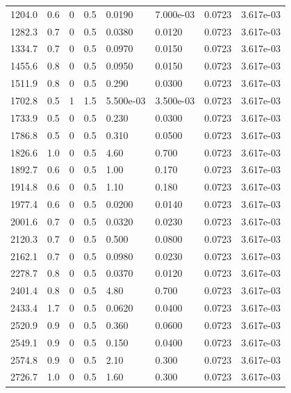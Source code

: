 \documentclass[preview]{standalone}
\begin{document}
{{\begin{tabular}{L{1.2cm}C{1.2cm} C{0.3cm}C{0.5cm} C{1.4cm}C{1.4cm} C{1.4cm}C{1.4cm}}
  1204.0  &   0.6  & 0     & 0.5 &  0.0190  & 7.000e-03  & 0.0723 &  3.617e-03   \\ 
  1282.3  &   0.7  & 0     & 0.5 &  0.0380  & 0.0120  & 0.0723 &  3.617e-03   \\ 
  1334.7  &   0.7  & 0     & 0.5 &  0.0970  & 0.0150  & 0.0723 &  3.617e-03   \\ 
  1455.6  &   0.8  & 0     & 0.5 &  0.0950  & 0.0150  & 0.0723 &  3.617e-03   \\ 
  1511.9  &   0.8  & 0     & 0.5 &  0.290  & 0.0300  & 0.0723 &  3.617e-03   \\ 
  1702.8  &   0.5  & 1     & 1.5 &  5.500e-03  & 3.500e-03  & 0.0723 &  3.617e-03   \\ 
  1733.9  &   0.5  & 0     & 0.5 &  0.230  & 0.0300  & 0.0723 &  3.617e-03   \\ 
  1786.8  &   0.5  & 0     & 0.5 &  0.310  & 0.0500  & 0.0723 &  3.617e-03   \\ 
  1826.6  &   1.0  & 0     & 0.5 &  4.60  & 0.700  & 0.0723 &  3.617e-03   \\ 
  1892.7  &   0.6  & 0     & 0.5 &  1.00  & 0.170  & 0.0723 &  3.617e-03   \\ 
  1914.8  &   0.6  & 0     & 0.5 &  1.10  & 0.180  & 0.0723 &  3.617e-03   \\ 
  1977.4  &   0.6  & 0     & 0.5 &  0.0200  & 0.0140  & 0.0723 &  3.617e-03   \\ 
  2001.6  &   0.7  & 0     & 0.5 &  0.0320  & 0.0230  & 0.0723 &  3.617e-03   \\ 
  2120.3  &   0.7  & 0     & 0.5 &  0.500  & 0.0800  & 0.0723 &  3.617e-03   \\ 
  2162.1  &   0.7  & 0     & 0.5 &  0.0980  & 0.0230  & 0.0723 &  3.617e-03   \\ 
  2278.7  &   0.8  & 0     & 0.5 &  0.0370  & 0.0120  & 0.0723 &  3.617e-03   \\ 
  2401.4  &   0.8  & 0     & 0.5 &  4.80  & 0.700  & 0.0723 &  3.617e-03   \\ 
  2433.4  &   1.7  & 0     & 0.5 &  0.0620  & 0.0400  & 0.0723 &  3.617e-03   \\ 
  2520.9  &   0.9  & 0     & 0.5 &  0.360  & 0.0600  & 0.0723 &  3.617e-03   \\ 
  2549.1  &   0.9  & 0     & 0.5 &  0.150  & 0.0400  & 0.0723 &  3.617e-03   \\ 
  2574.8  &   0.9  & 0     & 0.5 &  2.10  & 0.300  & 0.0723 &  3.617e-03   \\ 
  2726.7  &   1.0  & 0     & 0.5 &  1.60  & 0.300  & 0.0723 &  3.617e-03   \\ 

\end{tabular}}}
\end{document}
